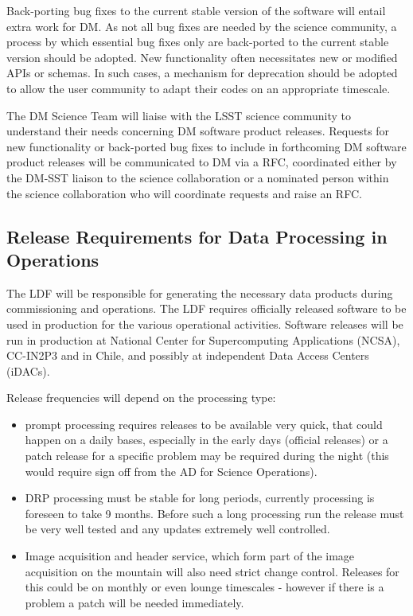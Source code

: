 Back-porting bug fixes to the current stable version of the software will entail extra work for \gls{DM}. 
As not all bug fixes are needed by the science community, a process by which essential bug fixes only are back-ported to the current stable version should be adopted. 
New functionality often necessitates new or modified APIs or schemas. 
In such cases, a mechanism for deprecation should be adopted to allow the user community to adapt their codes on an appropriate timescale.  

The \gls{DM} Science Team will liaise with the \gls{LSST} science community to understand their needs concerning \gls{DM} software product releases. 
Requests for new functionality or back-ported bug fixes to include in forthcoming \gls{DM} software product releases will be communicated to \gls{DM} via a \gls{RFC}, coordinated either by the DM-SST liaison to the science collaboration or a nominated person within the science collaboration who will coordinate requests and raise an \gls{RFC}. 


\subsection{Release Requirements for Data Processing in Operations} \label{sec:procreqs}


The \gls{LDF} will be responsible for generating the necessary data products during commissioning and operations. 
The \gls{LDF} requires officially released software to be used in production for the various operational activities.
Software releases will be run in production at National Center for Supercomputing Applications (\gls{NCSA}), CC-IN2P3 and in Chile, and possibly at independent Data Access Centers (iDACs).

Release frequencies will depend on the processing type:
\begin{itemize}
\item prompt processing requires releases to be available very quick, that could happen on a daily bases, especially in the early days (official releases)
 or a  patch release  for a specific problem may be required during the night (this would require sign off from the \gls{AD} for Science Operations).
\item \gls{DRP} processing  must be stable for long periods, currently processing is foreseen to take 9 months.  Before such a long processing run the release must be very well tested and any updates extremely well controlled.
\item Image acquisition and header service, which form part of the image acquisition on the mountain will also need strict change control. Releases for this could be on monthly or even lounge timescales - however if there is a problem a patch will be needed immediately.
\end{itemize}

